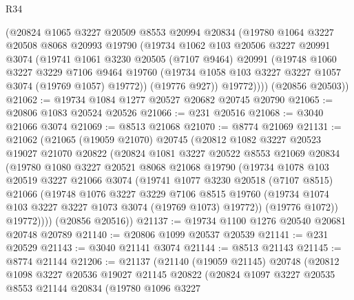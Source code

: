 \begin{lexlean}{R34}
\begin{coremodule}
        (@20824
          @1065
          @3227
          @20509
          @8553
          @20994
          @20834
          (@19780
            @1064
            @3227
            @20508
            @8068
            @20993
            @19790
            (@19734
              @1062
              @103
              @20506
              @3227
              @20991
              @3074
              (@19741
                @1061
                @3230
                @20505
                (@7107 @9464)
                @20991
                (@19748
                  @1060
                  @3227
                  @3229
                  @7106
                  @9464
                  @19760
                  (@19734 @1058 @103 @3227 @3227 @1057 @3074 (@19769 @1057) @19772))
                (@19776 @927))
              @19772))))
      (@20856 @20503))
@21062 := @19734 @1084 @1277 @20527 @20682 @20745 @20790
@21065 := @20806 @1083 @20524 @20526
@21066 := @231 @20516
@21068 := @3040 @21066 @3074
@21069 := @8513 @21068
@21070 := @8774 @21069
@21131 := @21062
    (@21065
      (@19059 @21070)
      @20745
      (@20812
        @1082
        @3227
        @20523
        @19027
        @21070
        @20822
        (@20824
          @1081
          @3227
          @20522
          @8553
          @21069
          @20834
          (@19780
            @1080
            @3227
            @20521
            @8068
            @21068
            @19790
            (@19734
              @1078
              @103
              @20519
              @3227
              @21066
              @3074
              (@19741
                @1077
                @3230
                @20518
                (@7107 @8515)
                @21066
                (@19748
                  @1076
                  @3227
                  @3229
                  @7106
                  @8515
                  @19760
                  (@19734 @1074 @103 @3227 @3227 @1073 @3074 (@19769 @1073) @19772))
                (@19776 @1072))
              @19772))))
      (@20856 @20516))
@21137 := @19734 @1100 @1276 @20540 @20681 @20748 @20789
@21140 := @20806 @1099 @20537 @20539
@21141 := @231 @20529
@21143 := @3040 @21141 @3074
@21144 := @8513 @21143
@21145 := @8774 @21144
@21206 := @21137
    (@21140
      (@19059 @21145)
      @20748
      (@20812
        @1098
        @3227
        @20536
        @19027
        @21145
        @20822
        (@20824
          @1097
          @3227
          @20535
          @8553
          @21144
          @20834
          (@19780
            @1096
            @3227

\end{coremodule}
\end{lexlean}
